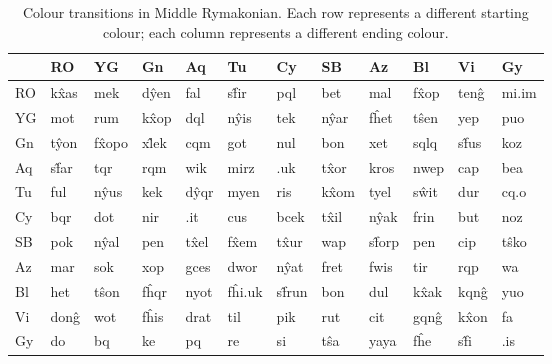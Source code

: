 \documentclass{book}
\newcommand{\lname}{Middle Rymakonian}
\begin{document}
\begin{table}[H]
    \begin{adjustwidth}{-1cm}{}
        \caption{Colour transitions in \lname. Each row represents a different starting colour; each column represents a different ending colour. \label{tab:colourtrans}}
        \centering
        \begin{tabular}{
                l|
                >{\kardinal}l>{\kardinal}l>{\kardinal}l
                >{\kardinal}l>{\kardinal}l>{\kardinal}l
                >{\kardinal}l>{\kardinal}l>{\kardinal}l
                >{\kardinal}l>{\kardinal}l}
            & \textnormal{RO} & \textnormal{YG} & \textnormal{Gn} &
            \textnormal{Aq} & \textnormal{Tu} & \textnormal{Cy} &
            \textnormal{SB} & \textnormal{Az} & \textnormal{Bl} &
            \textnormal{Vi} & \textnormal{Gy} \\
            \hline
            RO & k\^xas & mek & d\^yen & fal & s\^fir & pql & bet & mal & f\^xop & ten\^g & mi.im \\
            YG & mot & rum & k\^xop & dql & n\^yis & tek & n\^yar & f\^het & t\^sen & yep & puo \\
            Gn & t\^yon & f\^xopo & x\^lek & cqm & got & nul & bon & xet & sqlq & s\^fus & koz \\
            Aq & s\^far & tqr & rqm & wik & mirz & .uk & t\^xor & kros & nwep & cap & bea \\
            Tu & ful & n\^yus & kek & d\^yqr & myen & ris & k\^xom & tyel & s\^wit & dur & cq.o \\
            Cy & bqr & dot & nir & .it & cus & bcek & t\^xil & n\^yak & frin & but & noz \\
            SB & pok & n\^yal & pen & t\^xel & f\^xem & t\^xur & wap & s\^forp & pen & cip & t\^sko \\
            Az & mar & sok & xop & gces & dwor & n\^yat & fret & fwis & tir & rqp & wa \\
            Bl & het & t\^son & f\^hqr & nyot & f\^hi.uk & s\^frun & bon & dul & k\^xak & kqn\^g & yuo \\
            Vi & don\^g & wot & f\^his & drat & til & pik & rut & cit & gqn\^g & k\^xon & fa \\
            Gy & do & bq & ke & pq & re & si & t\^sa & yaya & f\^he & s\^fi & .is \\
        \end{tabular}
    \end{adjustwidth}
\end{table}
\end{document}
